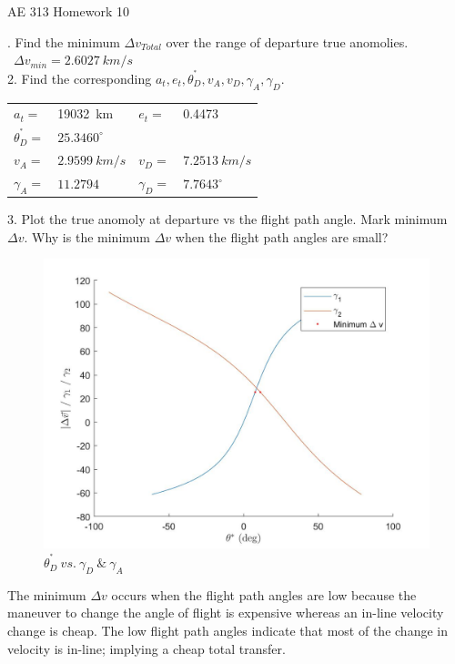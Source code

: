 \documentclass[hidelinks,12pt]{article}
\begin{document}

\begin{center}
\large AE 313 Homework 10
\end{center}
. Find the minimum $\Delta v_{Total}$ over the range of departure true anomolies.\\
~$\Delta v_{min}=2.6027~km/s$\\

\vspace{10px}
2. Find the corresponding $a_t, e_t, \theta^{^*}_D, v_A, v_D, \gamma_A, \gamma_D$.\\
\begin{tabular}{llll}
$a_t=$&19032~km&$e_t=$&0.4473\\
$\theta^{^*}_D=$&$25.3460^\circ$\\
$v_A=$&$2.9599~km/s$&$v_D=$&$7.2513~km/s$\\
$\gamma_A=$&$11.2794$&$\gamma_D=$&$7.7643^\circ$
\end{tabular}

\vspace{10px}
3. Plot the true anomoly at departure vs the flight path angle. Mark minimum $\Delta v$. Why is the minimum $\Delta v$ when the flight path angles are small?\\
\begin{figure}[!htb]
  \center
  \includegraphics[scale=0.4]{FPAGraphs}
  \caption{$\theta^{^*}_D~vs.~\gamma_D~\&~\gamma_A$}
  \label{fig:ta-vs-fpa}
\end{figure}
The minimum $\Delta v$ occurs when the flight path angles are low because the maneuver to change the angle of flight is expensive whereas an in-line velocity change is cheap. The low flight path angles indicate that most of the change in velocity is in-line; implying a cheap total transfer.
\end{document}
